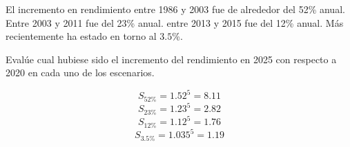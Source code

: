 \begin{acexercise}\end{acexercise}

El incremento en rendimiento entre 1986 y 2003 fue de alrededor del 52\% anual.
Entre 2003 y 2011 fue del 23\% anual.
entre 2013 y 2015 fue del 12\% anual.
Más recientemente ha estado en torno al $3.5$\%.

Evalúe cual hubiese sido el incremento del rendimiento en 2025 con respecto
a 2020 en cada uno de los escenarios.

\begin{acsolution}\end{acsolution}

\[S_{52\%} = 1.52^5 = 8.11\]
\[S_{23\%} = 1.23^5 = 2.82\]
\[S_{12\%} = 1.12^5 = 1.76\]
\[S_{3.5\%} = 1.035^5 = 1.19\]


